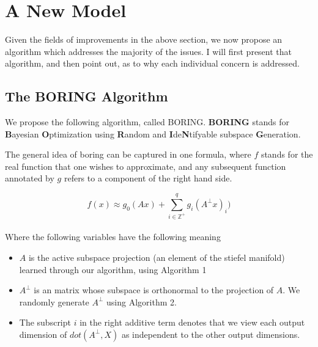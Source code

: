 \chapter{A New Model}

\ifpdf
    \graphicspath{{Chapter4/Figs/Raster/}{Chapter4/Figs/PDF/}{Chapter4/Figs/}}
\else
    \graphicspath{{Chapter4/Figs/Vector/}{Chapter4/Figs/}}
\fi

Given the fields of improvements in the above section, we now propose an algorithm which addresses the majority of the issues.
I will first present that algorithm, and then point out, as to why each individual concern is addressed.

\section{The BORING Algorithm}

We propose the following algorithm, called BORING. \textbf{BORING} stands for \textbf{B}ayesian \textbf{O}ptimization using \textbf{R}andom and \textbf{I}de\textbf{N}tifyable subspace \textbf{G}eneration.

The general idea of boring can be captured in one formula, where $f$ stands for the real function that one wishes to approximate, and any subsequent function annotated by $g$ refers to a component of the right hand side.

\begin{equation}
f(x) \approx g_0(A x) + \sum_{i \in \mathbb{Z}^+}^{q} g_i( A^{\bot} x)_i )
\label{eq:dimRedEquation}
\end{equation} \\

Where the following variables have the following meaning
\begin{itemize}
\item $A$ is the active subspace projection (an element of the stiefel manifold) learned through our algorithm, using Algorithm 1
\item $A^{\bot}$ is an matrix whose subspace is orthonormal to the projection of $A$.
We randomly generate $A^{\bot}$ using Algorithm 2.
\item The subscript $i$ in the right additive term denotes that we view each output dimension of $dot(A^{\bot}, X)$ as independent to the other output dimensions.

\end{itemize}

